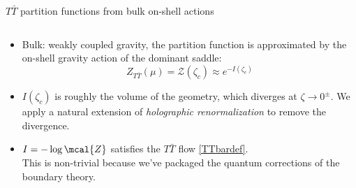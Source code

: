 \documentclass[
	10pt
	,noamsthm
]{beamer}
\newcommand{\TTbar}{\texorpdfstring{\ensuremath{T\bar{T}}}{TTbar}\xspace}
\begin{document}
\begin{frame}{\TTbar partition functions from bulk on-shell actions}{%
	\textcite{Caputa:2020lpa}
}
\begin{columns}
\figGlueon
\hspace{-1.5em}
\begin{column}{.7\textwidth}
\vspace{-.3\baselineskip}
\begin{itemize}
\item Bulk: weakly coupled gravity, the partition function is approximated by the on-shell gravity action of the dominant saddle:
	\begin{equation}
		Z_{T\bar T} (\mu) = \mathcal Z (\zeta_c) \approx  e^{-I(\zeta_c)}\label{partition2}
	\end{equation}

\pause
\item $I(\zeta_c)$ is roughly the volume of the geometry, which diverges at $\zeta \to 0^\pm$. We apply a natural extension of \textit{holographic renormalization} to remove the divergence.

\pause
\item $I = -\log \mcal{Z}$ satisfies the \TTbar flow \eqref{TTbardef}.\\
	This is non-trivial because we've packaged the quantum corrections of the boundary theory.
\end{itemize}
\end{column}
\end{columns}
\end{frame}
\end{document}
